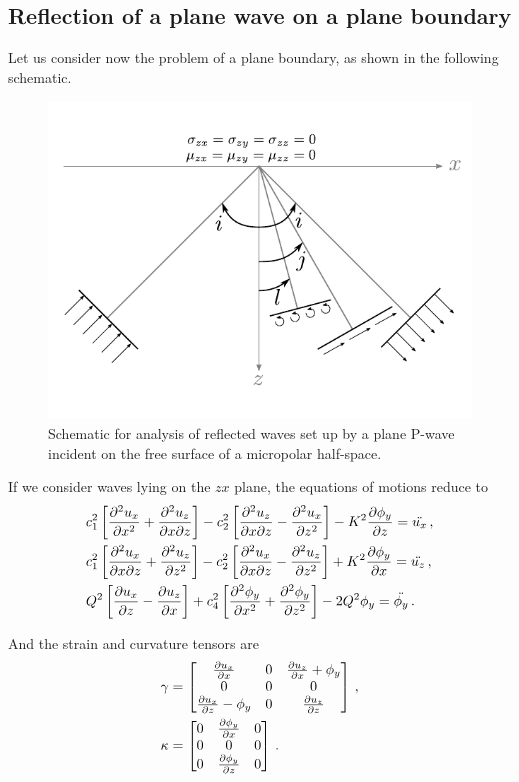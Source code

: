 \documentclass[12pt]{article}
\begin{document}
\subsection{Reflection of a plane wave on a plane boundary}
Let us consider now the problem of a plane boundary, as shown in the following schematic.
\begin{figure}[h]
  \centering
  \includegraphics[scale=1]{img/reflection_schematic.pdf}
  \caption{Schematic for analysis of reflected waves set up by a plane P-wave incident on the free surface of a micropolar half-space.}
  \label{fig:reflection_schematic}
\end{figure}

If we consider waves lying on the \(zx\) plane, the equations of motions reduce to
\begin{align*}
&c_1^2\left[\pdv[2]{u_x}{x} + \pdv{u_z}{x}{z}\right] - c_2^2\left[\pdv{u_z}{x}{z} - \pdv[2]{u_x}{z}\right] - K^2\pdv{\phi_y}{z} = \ddot{u_x}\, ,\\
&c_1^2\left[\pdv{u_x}{x}{z} + \pdv[2]{u_z}{z}\right] - c_2^2\left[\pdv{u_x}{x}{z} - \pdv[2]{u_z}{z}\right] + K^2\pdv{\phi_y}{x} = \ddot{u_z}\, ,\\
&Q^2\left[\pdv{u_x}{z} - \pdv{u_z}{x}\right] + c_4^2\left[\pdv[2]{\phi_y}{x} + \pdv[2]{\phi_y}{z}\right] - 2Q^2\phi_y = \ddot{\phi_y}\, .
\end{align*}

And the strain and curvature tensors are
\begin{align*}
&\gamma = \begin{bmatrix}
  \pdv{u_x}{x} &0 &\pdv{u_z}{x} + \phi_y\\
  0 & 0 &0\\
  \pdv{u_x}{z} - \phi_y &0 &\pdv{u_z}{z}
\end{bmatrix}\, ,\\
&\kappa = \begin{bmatrix}
  0 &\pdv{\phi_y}{x} &0\\
  0 &0 &0\\
  0 &\pdv{\phi_y}{z} &0
\end{bmatrix}\, .
\end{align*}
\end{document}
